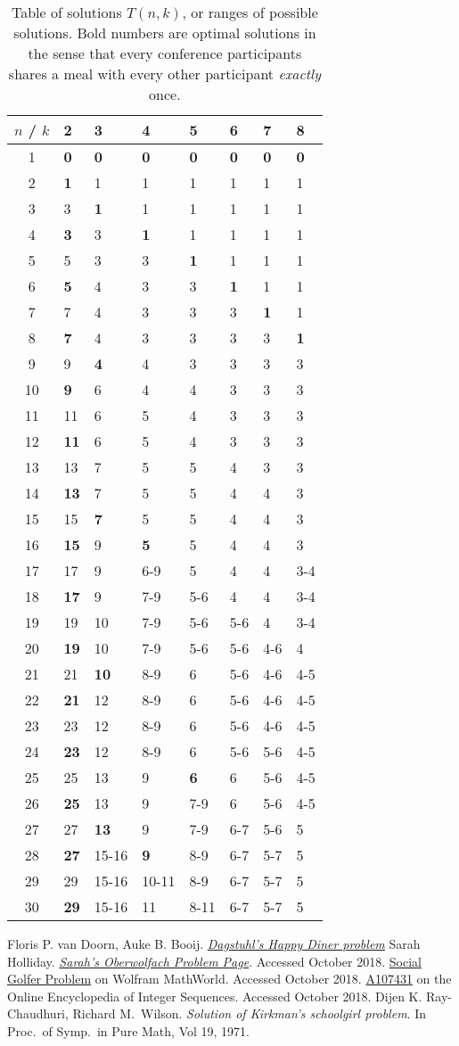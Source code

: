 \documentclass[a4paper]{article}
\begin{document}
\begin{table}
  \centering
\begin{tabular}{@{}c|lllllll@{}}
$n$ / $k$ & 2 & 3 & 4 & 5 & 6 & 7 & 8\tabularnewline
\hline
1 & \textbf{0} & \textbf{0} & \textbf{0} & \textbf{0} & \textbf{0} &
\textbf{0} & \textbf{0}\tabularnewline
2 & \textbf{1} & 1 & 1 & 1 & 1 & 1 & 1\tabularnewline
3 & 3 & \textbf{1} & 1 & 1 & 1 & 1 & 1\tabularnewline
4 & \textbf{3} & 3 & \textbf{1} & 1 & 1 & 1 & 1\tabularnewline
5 & 5 & 3 & 3 & \textbf{1} & 1 & 1 & 1\tabularnewline
6 & \textbf{5} & 4 & 3 & 3 & \textbf{1} & 1 & 1\tabularnewline
7 & 7 & 4 & 3 & 3 & 3 & \textbf{1} & 1\tabularnewline
8 & \textbf{7} & 4 & 3 & 3 & 3 & 3 & \textbf{1}\tabularnewline
9 & 9 & \textbf{4} & 4 & 3 & 3 & 3 & 3\tabularnewline
10 & \textbf{9} & 6 & 4 & 4 & 3 & 3 & 3\tabularnewline
11 & 11 & 6 & 5 & 4 & 3 & 3 & 3\tabularnewline
12 & \textbf{11} & 6 & 5 & 4 & 3 & 3 & 3\tabularnewline
13 & 13 & 7 & 5 & 5 & 4 & 3 & 3\tabularnewline
14 & \textbf{13} & 7 & 5 & 5 & 4 & 4 & 3\tabularnewline
15 & 15 & \textbf{7} & 5 & 5 & 4 & 4 & 3\tabularnewline
16 & \textbf{15} & 9 & \textbf{5} & 5 & 4 & 4 & 3\tabularnewline
17 & 17 & 9 & 6-9 & 5 & 4 & 4 & 3-4\tabularnewline
18 & \textbf{17} & 9 & 7-9 & 5-6 & 4 & 4 & 3-4\tabularnewline
19 & 19 & 10 & 7-9 & 5-6 & 5-6 & 4 & 3-4\tabularnewline
20 & \textbf{19} & 10 & 7-9 & 5-6 & 5-6 & 4-6 & 4\tabularnewline
21 & 21 & \textbf{10} & 8-9 & 6 & 5-6 & 4-6 & 4-5\tabularnewline
22 & \textbf{21} & 12 & 8-9 & 6 & 5-6 & 4-6 & 4-5\tabularnewline
23 & 23 & 12 & 8-9 & 6 & 5-6 & 4-6 & 4-5\tabularnewline
24 & \textbf{23} & 12 & 8-9 & 6 & 5-6 & 5-6 & 4-5\tabularnewline
25 & 25 & 13 & 9 & \textbf{6} & 6 & 5-6 & 4-5\tabularnewline
26 & \textbf{25} & 13 & 9 & 7-9 & 6 & 5-6 & 4-5\tabularnewline
27 & 27 & \textbf{13} & 9 & 7-9 & 6-7 & 5-6 & 5\tabularnewline
28 & \textbf{27} & 15-16 & \textbf{9} & 8-9 & 6-7 & 5-7 &
5\tabularnewline
29 & 29 & 15-16 & 10-11 & 8-9 & 6-7 & 5-7 & 5\tabularnewline
30 & \textbf{29} & 15-16 & 11 & 8-11 & 6-7 & 5-7 & 5\tabularnewline
\end{tabular}
\caption{Table of solutions $T(n,k)$, or ranges of possible
  solutions.  Bold numbers
  are optimal solutions in the sense that every conference
  participants shares a meal with every other participant
  \emph{exactly} once.}
\label{tab:dagstuhl}
\end{table}

\begin{thebibliography}{0}
  Floris P. van Doorn, Auke B. Booij.
  \href{https://github.com/fpvandoorn/Dagstuhl-tables/}{\textsl{Dagstuhl's
    Happy Diner problem}}
 Sarah Holliday.  \href{http://facultyweb.kennesaw.edu/shollid4/oberwolfach.php}{\textsl{Sarah's Oberwolfach
    Problem Page}}. Accessed October 2018.
  \href{http://mathworld.wolfram.com/SocialGolferProblem.html}{Social
    Golfer Problem} on Wolfram MathWorld.  Accessed October 2018.
 \href{https://oeis.org/A107431}{A107431} on the
  Online Encyclopedia of Integer Sequences. Accessed October 2018.
 Dijen K. Ray-Chaudhuri, Richard
  M.\ Wilson. \textsl{Solution of Kirkman's schoolgirl problem}. In
  Proc.\ of Symp.\ in Pure Math, Vol 19, 1971.
\end{thebibliography}
\end{document}
